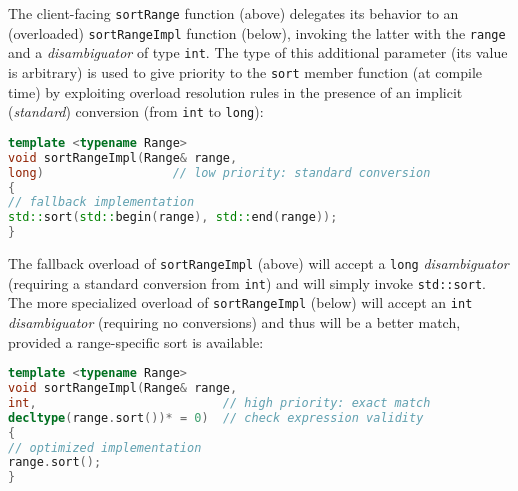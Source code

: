 \noindent The client-facing \texttt{sortRange} function (above) delegates its
behavior to an (overloaded) \texttt{sortRangeImpl} function (below),
invoking the latter with the \texttt{range} and a \emph{disambiguator}
of type \texttt{int}. The type of this additional parameter (its value
is arbitrary) is used to give priority to the \texttt{sort} member
function (at compile time) by exploiting overload resolution rules in
the presence of an implicit (\emph{standard}) conversion (from
\texttt{int} to \texttt{long}):

\begin{lstlisting}[language=C++]
template <typename Range>
void sortRangeImpl(Range& range,
long)                  // low priority: standard conversion
{
// fallback implementation
std::sort(std::begin(range), std::end(range));
}
\end{lstlisting}

\noindent The fallback overload of \texttt{sortRangeImpl} (above) will accept a
\texttt{long} \emph{disambiguator} (requiring a standard conversion from
\texttt{int}) and will simply invoke \texttt{std::sort}. The more
specialized overload of \texttt{sortRangeImpl} (below) will accept an
\texttt{int} \emph{disambiguator} (requiring no conversions) and thus
will be a better match, provided a range-specific sort is available:

\begin{lstlisting}[language=C++]
template <typename Range>
void sortRangeImpl(Range& range,
int,                          // high priority: exact match
decltype(range.sort())* = 0)  // check expression validity
{
// optimized implementation
range.sort();
}
\end{lstlisting}

